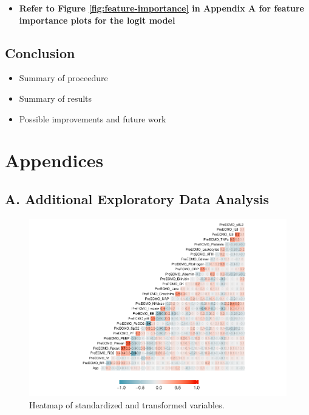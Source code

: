 \documentclass[12pt,]{article}
\providecommand{\tightlist}{%
  \setlength{\itemsep}{0pt}\setlength{\parskip}{0pt}}
\begin{document}
\begin{itemize}
\tightlist
\item
  \textbf{Refer to Figure \ref{fig:feature-importance} in Appendix A for
  feature importance plots for the logit model}
\end{itemize}

\subsection{Conclusion}\label{conclusion}

\begin{itemize}
\tightlist
\item
  Summary of proceedure
\item
  Summary of results
\item
  Possible improvements and future work
\end{itemize}

\newpage

\section{Appendices}\label{appendices}

\subsection{A. Additional Exploratory Data
Analysis}\label{a.-additional-exploratory-data-analysis}

\begin{figure}[H]

{\centering \includegraphics[width=1\linewidth]{figure/graphics-unnamed-chunk-11-1} 

}

\caption{\label{fig:heatmap-standardized}Heatmap of standardized and transformed variables.}\label{fig:unnamed-chunk-11}
\end{figure}
\end{document}
